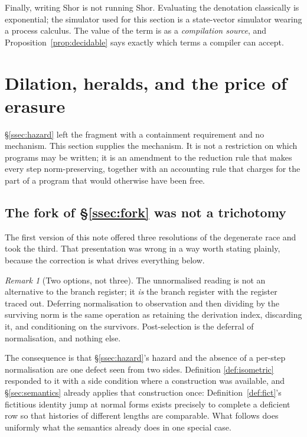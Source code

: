 \documentclass[11pt,a4paper]{article}
\theoremstyle{plain}
\theoremstyle{definition}
\theoremstyle{remark}
\newtheorem{remark}[theorem]{Remark}
\begin{document}
Finally, writing Shor is not running Shor. Evaluating the denotation classically
is exponential; the simulator used for this section is a state-vector simulator
wearing a process calculus. The value of the term is as a \emph{compilation
source}, and Proposition~\ref{prop:decidable} says exactly which terms a
compiler can accept.

\section{Dilation, heralds, and the price of erasure}\label{sec:dilation}

\S\ref{ssec:hazard} left the fragment with a containment requirement and no
mechanism. This section supplies the mechanism. It is not a restriction on which
programs may be written; it is an amendment to the reduction rule that makes
every step norm-preserving, together with an accounting rule that charges for the
part of a program that would otherwise have been free.

\subsection{The fork of \S\ref{ssec:fork} was not a trichotomy}\label{ssec:concession}

The first version of this note offered three resolutions of the degenerate race
and took the third. That presentation was wrong in a way worth stating plainly,
because the correction is what drives everything below.

\begin{remark}[Two options, not three]\label{rem:concession}
The unnormalised reading is not an alternative to the branch register; it
\emph{is} the branch register with the register traced out. Deferring
normalisation to observation and then dividing by the surviving norm is the same
operation as retaining the derivation index, discarding it, and conditioning on
the survivors. Post-selection is the deferral of normalisation, and nothing else.
\end{remark}

The consequence is that \S\ref{ssec:hazard}'s hazard and the absence of a
per-step normalisation are one defect seen from two sides. Definition
\ref{def:isometric} responded to it with a side condition where a construction
was available, and \S\ref{sec:semantics} already applies that construction once:
Definition~\ref{def:fict}'s fictitious identity jump at normal forms exists
precisely to complete a deficient row so that histories of different lengths are
comparable. What follows does uniformly what the semantics already does in one
special case.
\end{document}
